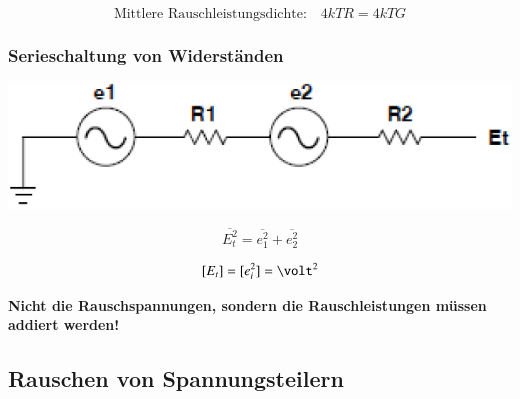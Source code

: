 $$ \boxed{ \text{Mittlere Rauschleistungsdichte:} \quad  4 k T R  = 4 k T G} $$ 


\subsubsection{Serieschaltung von Widerständen}

\begin{minipage}[c]{0.4\columnwidth}
    \includegraphics[width=\columnwidth]{images/serieschaltung_rauschende_widerstaende.png}
\end{minipage}
\hfill
\begin{minipage}[c]{0.58\columnwidth}
    \begin{minipage}[c]{0.48\columnwidth}
        $$ \boxed{ \overline{E_t^2} = \overline{e_1^2} + \overline{e_2^2} } $$
    \end{minipage}
    \hfill
    \begin{minipage}[c]{0.48\columnwidth}
        $$ [E_t] = [e_i^2] = \volt^2 $$
    \end{minipage}
\end{minipage}

\vspace{0.2cm}
\textbf{Nicht die Rauschspannungen, sondern die Rauschleistungen müssen addiert werden!} 


\subsection{Rauschen von Spannungsteilern}

